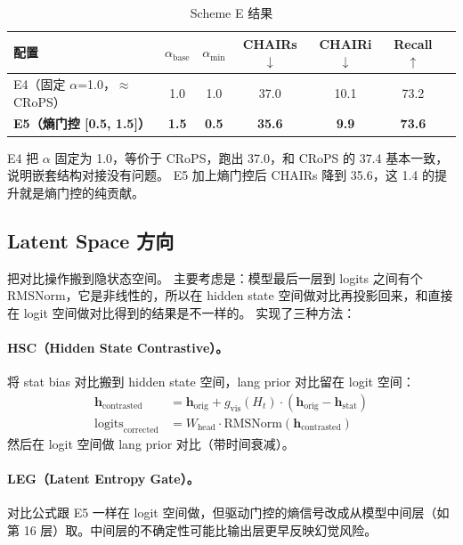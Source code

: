 \documentclass[12pt,a4paper]{ctexart}
\begin{document}
\begin{table}[H]
\centering
\caption{Scheme E 结果}
\label{tab:scheme_e}
\begin{tabular}{lcccccc}
\toprule
\textbf{配置} & $\alpha_{\text{base}}$ & $\alpha_{\min}$ & \textbf{CHAIRs$\downarrow$} & \textbf{CHAIRi$\downarrow$} & \textbf{Recall$\uparrow$} \\
\midrule
E4（固定 $\alpha$=1.0，$\approx$CRoPS） & 1.0 & 1.0 & 37.0 & 10.1 & 73.2 \\
\textbf{E5（熵门控 [0.5, 1.5]）} & \textbf{1.5} & \textbf{0.5} & \textbf{35.6} & \textbf{9.9} & \textbf{73.6} \\
\bottomrule
\end{tabular}
\end{table}

E4 把 $\alpha$ 固定为 1.0，等价于 CRoPS，跑出 37.0，和 CRoPS 的 37.4 基本一致，说明嵌套结构对接没有问题。
E5 加上熵门控后 CHAIRs 降到 35.6，这 1.4 的提升就是熵门控的纯贡献。


\subsection{Latent Space 方向}

把对比操作搬到隐状态空间。
主要考虑是：模型最后一层到 logits 之间有个 RMSNorm，它是非线性的，所以在 hidden state 空间做对比再投影回来，和直接在 logit 空间做对比得到的结果是不一样的。
实现了三种方法：

\paragraph{HSC（Hidden State Contrastive）。}
将 stat bias 对比搬到 hidden state 空间，lang prior 对比留在 logit 空间：
\begin{align}
\mathbf{h}_{\text{contrasted}} &= \mathbf{h}_{\text{orig}} + g_{\text{vis}}(H_t) \cdot (\mathbf{h}_{\text{orig}} - \mathbf{h}_{\text{stat}}) \\
\text{logits}_{\text{corrected}} &= W_{\text{head}} \cdot \text{RMSNorm}(\mathbf{h}_{\text{contrasted}})
\end{align}
然后在 logit 空间做 lang prior 对比（带时间衰减）。

\paragraph{LEG（Latent Entropy Gate）。}
对比公式跟 E5 一样在 logit 空间做，但驱动门控的熵信号改成从模型中间层（如第 16 层）取。中间层的不确定性可能比输出层更早反映幻觉风险。
\end{document}
